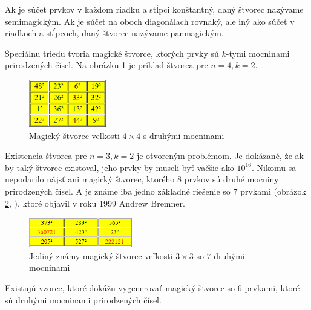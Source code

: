 \begin{subnote} Ak je súčet prvkov v každom riadku a stĺpci konštantný, daný štvorec nazývame semimagickým. Ak je súčet na oboch diagonálach rovnaký, ale iný ako súčet v riadkoch a stĺpcoch, daný štvorec nazývame panmagickým.
\end{subnote}

Špeciálnu triedu tvoria magické štvorce, ktorých prvky sú $k$-tymi mocninami prirodzených čísel. Na obrázku \ref{obr:fig_squared_magic_4x4} je príklad štvorca pre $n = 4, k = 2$.

\begin{figure}[H]
\centerline{\includegraphics[width=0.3\textwidth]{images/squared_magic_4x4}}
\caption[Magický štvorec veľkosti $4 \times 4$ s druhými mocninami]{Magický štvorec veľkosti $4 \times 4$ s druhými mocninami \cite{multimagie}}
\label{obr:fig_squared_magic_4x4}
\end{figure}

Existencia štvorca pre $n = 3, k = 2$ je otvoreným problémom. Je dokázané, že ak by taký štvorec existoval, jeho prvky by museli byť vačšie ako $10^{16}$. Nikomu sa nepodarilo nájsť ani magický štvorec, ktorého $8$ prvkov sú druhé mocniny prirodzených čísel. A je známe iba jedno základné riešenie so $7$ prvkami (obrázok \ref{obr:fig_bremner_magic_3x3}, \cite{multimagie}), ktoré objavil v roku 1999 Andrew Bremner.

\begin{figure}[H]
\centerline{\includegraphics[width=0.4\textwidth]{images/bremner_magic_3x3}}
\caption[Magický štvorec veľkosti $3 \times 3$ so $7$ druhými mocninami]{Jediný známy magický štvorec veľkosti $3 \times 3$ so $7$ druhými mocninami \cite{multimagie}}
\label{obr:fig_bremner_magic_3x3}
\end{figure}

\begin{subnote} Existujú vzorce, ktoré dokážu vygenerovať magický štvorec so $6$ prvkami, ktoré sú druhými mocninami prirodzených čísel.
\end{subnote}

